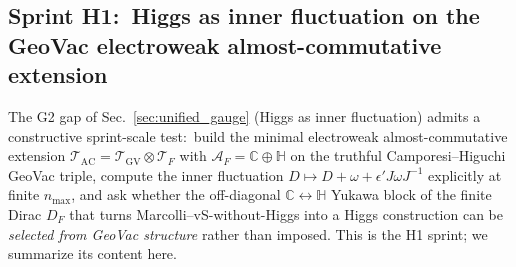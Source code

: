 \documentclass[11pt]{article}
\begin{document}
\subsection{Sprint H1:\ Higgs as inner fluctuation on the GeoVac
electroweak almost-commutative extension}
\label{sec:higgs_h1}

The G2 gap of Sec.~\ref{sec:unified_gauge} (Higgs as inner
fluctuation) admits a constructive sprint-scale test:\ build the
minimal electroweak almost-commutative extension
$\mathcal{T}_{\mathrm{AC}} = \mathcal{T}_{\mathrm{GV}} \otimes
\mathcal{T}_F$ with $\mathcal{A}_F = \mathbb{C} \oplus \mathbb{H}$ on
the truthful Camporesi--Higuchi GeoVac triple, compute the inner
fluctuation $D \mapsto D + \omega + \epsilon' J \omega J^{-1}$
explicitly at finite $n_{\max}$, and ask whether the off-diagonal
$\mathbb{C} \leftrightarrow \mathbb{H}$ Yukawa block of the finite
Dirac $D_F$ that turns Marcolli--vS-without-Higgs into a Higgs
construction can be \emph{selected from GeoVac structure} rather
than imposed.  This is the H1 sprint; we summarize its content here.
\end{document}
